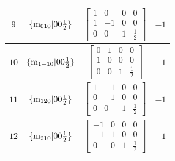 \documentclass[fleqn,8pt]{jsarticle}
\begin{document}
\begin{longtable}{cccc}
$ 9 $ & $ \{{\rm m}_{010}|0 0 \frac{1}{2}\} $ & $ \begin{bmatrix} 1 & 0 & 0 & 0 \\ 1 & -1 & 0 & 0 \\ 0 & 0 & 1 & \frac{1}{2} \end{bmatrix} $ & $ -1 $ \\ \hline
$ 10 $ & $ \{{\rm m}_{1-10}|0 0 \frac{1}{2}\} $ & $ \begin{bmatrix} 0 & 1 & 0 & 0 \\ 1 & 0 & 0 & 0 \\ 0 & 0 & 1 & \frac{1}{2} \end{bmatrix} $ & $ -1 $ \\ \hline
$ 11 $ & $ \{{\rm m}_{120}|0 0 \frac{1}{2}\} $ & $ \begin{bmatrix} 1 & -1 & 0 & 0 \\ 0 & -1 & 0 & 0 \\ 0 & 0 & 1 & \frac{1}{2} \end{bmatrix} $ & $ -1 $ \\ \hline
$ 12 $ & $ \{{\rm m}_{210}|0 0 \frac{1}{2}\} $ & $ \begin{bmatrix} -1 & 0 & 0 & 0 \\ -1 & 1 & 0 & 0 \\ 0 & 0 & 1 & \frac{1}{2} \end{bmatrix} $ & $ -1 $ \\
\end{longtable}
\end{document}
